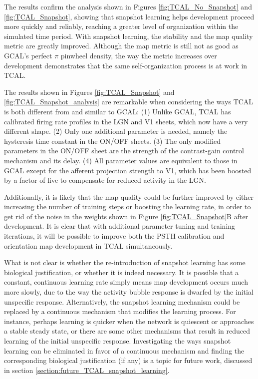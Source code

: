 \documentclass[phd,ianc,twoside]{infthesis}
\begin{document}
The results confirm the analysis shown in Figures
\ref{fig:TCAL_No_Snapshot} and \ref{fig:TCAL_Snapshot}, showing that
snapshot learning helps development proceed more quickly and reliably,
reaching a greater level of organization within the simulated time period.
With snapshot learning, the
stability and the map quality metric are greatly improved. Although the
map metric is still not as good as GCAL's perfect $\pi$
pinwheel density, the way the metric increases over development
demonstrates that the same self-organization process is at work in TCAL.

The results shown in Figures \ref{fig:TCAL_Snapshot} and
\ref{fig:TCAL_Snapshot_analysis} are remarkable when considering the
ways TCAL is both different from and similar to GCAL: (1) Unlike GCAL,
TCAL has calibrated firing rate profiles in the LGN and V1 sheets, which
now have a very different shape. (2) Only
one additional parameter is needed, namely the hysteresis time constant
in the ON/OFF sheets. (3) The only modified parameters in the ON/OFF sheet
are the strength of the contrast-gain control mechanism and its delay. (4)
All parameter values are equivalent to those in GCAL except for the
afferent projection strength to V1, which has been boosted by a factor of
five to compensate for reduced activity in the LGN.

Additionally, it is likely that the map quality could be further
improved by either increasing the number of training steps or boosting
the learning rate, in order to get rid of the noise in the weights shown
in Figure \ref{fig:TCAL_Snapshot}B after development. It is clear that
with additional parameter tuning and training iterations, it will be
possible to improve both the PSTH calibration and orientation map
development in TCAL simultaneously.

What is not clear is whether the re-introduction of snapshot learning has
some biological justification, or whether it is indeed necessary. It
is possible that a constant, 
continuous learning rate simply means map development occurs much more
slowly, due to the way the activity bubble response is dwarfed by the
initial unspecific response. Alternatively, the snapshot learning
mechanism could be replaced by a continuous mechanism that modifies the
learning process. For instance, perhaps learning is quicker when the
network is quiescent or approaches a stable steady state, or there are some
other mechanisms that result in reduced learning of the initial
unspecific response.  Investigating the ways snapshot learning can be
eliminated in favor of a continuous mechanism and finding the
corresponding biological justification (if any) is a topic for future
work, discussed in section \ref{section:future_TCAL_snapshot_learning}.
\end{document}
